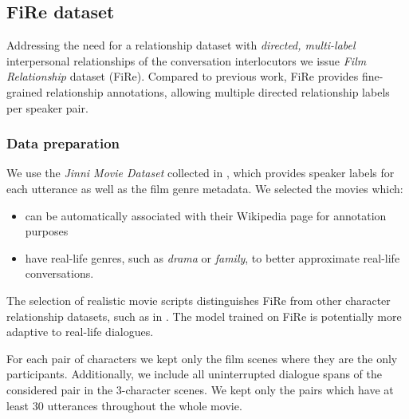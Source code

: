 \subsection{FiRe dataset}
\label{relatinoship_dataset}

Addressing the need for a relationship dataset with \emph{directed, multi-label} interpersonal relationships of the conversation interlocutors we issue \textit{Film Relationship} dataset (FiRe). Compared to previous work, FiRe provides fine-grained relationship annotations, allowing multiple directed relationship labels per speaker pair. %

\subsubsection{Data preparation}
We use the 
\emph{Jinni Movie Dataset}
collected in \citet{gorinski2018s}, which 
provides speaker labels for each utterance as well as the film genre metadata.
We selected the movies which:
\begin{itemize}[topsep=3pt,itemsep=2pt,partopsep=3pt, parsep=3pt]
    \item can be automatically associated with their Wikipedia page for annotation purposes
    \item have real-life genres, such as \emph{drama} or \emph{family}, to better approximate real-life conversations.
\end{itemize}
The selection of realistic movie scripts distinguishes FiRe from other character relationship datasets, such as in \citet{jia2020ddrel}. The model trained on FiRe 
is potentially more adaptive
to real-life dialogues.

For each pair of characters we kept only the film scenes where they are the only participants. Additionally, we include all uninterrupted dialogue spans of the considered pair in the 3-character scenes. We kept only the pairs which have at least 30 utterances throughout the whole movie.

